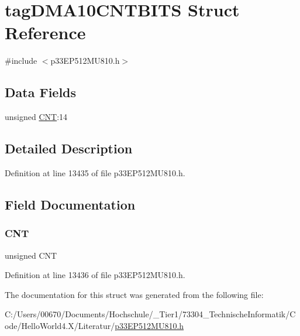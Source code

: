 \hypertarget{structtag_d_m_a10_c_n_t_b_i_t_s}{}\section{tag\+D\+M\+A10\+C\+N\+T\+B\+I\+TS Struct Reference}
\label{structtag_d_m_a10_c_n_t_b_i_t_s}


{\ttfamily \#include $<$p33\+E\+P512\+M\+U810.\+h$>$}

\subsection*{Data Fields}
\begin{DoxyCompactItemize}
\item 
unsigned \hyperlink{structtag_d_m_a10_c_n_t_b_i_t_s_a30be39d82c244f19fd98dd74227487f6}{C\+NT}\+:14
\end{DoxyCompactItemize}


\subsection{Detailed Description}


Definition at line 13435 of file p33\+E\+P512\+M\+U810.\+h.



\subsection{Field Documentation}
\mbox{\label{structtag_d_m_a10_c_n_t_b_i_t_s_a30be39d82c244f19fd98dd74227487f6}} 
\subsubsection{\texorpdfstring{C\+NT}{CNT}}
{\footnotesize\ttfamily unsigned C\+NT}



Definition at line 13436 of file p33\+E\+P512\+M\+U810.\+h.



The documentation for this struct was generated from the following file\+:\begin{DoxyCompactItemize}
\item 
C\+:/\+Users/00670/\+Documents/\+Hochschule/\+\_\+\+Tier1/73304\+\_\+\+Technische\+Informatik/\+Code/\+Hello\+World4.\+X/\+Literatur/\hyperlink{p33_e_p512_m_u810_8h}{p33\+E\+P512\+M\+U810.\+h}\end{DoxyCompactItemize}

